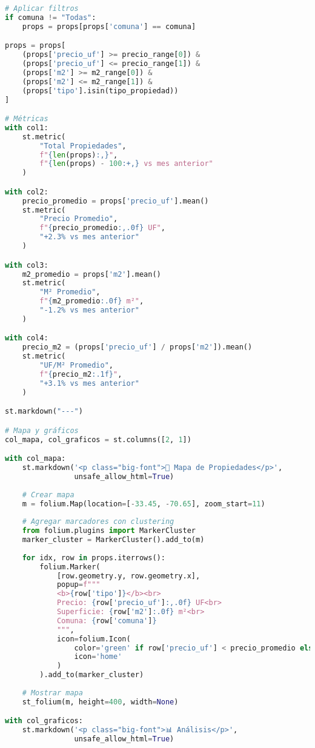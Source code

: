 \documentclass[11pt,a4paper]{article}
\begin{document}
\begin{lstlisting}[language=Python]
# Aplicar filtros
if comuna != "Todas":
    props = props[props['comuna'] == comuna]

props = props[
    (props['precio_uf'] >= precio_range[0]) &
    (props['precio_uf'] <= precio_range[1]) &
    (props['m2'] >= m2_range[0]) &
    (props['m2'] <= m2_range[1]) &
    (props['tipo'].isin(tipo_propiedad))
]

# Métricas
with col1:
    st.metric(
        "Total Propiedades",
        f"{len(props):,}",
        f"{len(props) - 100:+,} vs mes anterior"
    )

with col2:
    precio_promedio = props['precio_uf'].mean()
    st.metric(
        "Precio Promedio",
        f"{precio_promedio:,.0f} UF",
        "+2.3% vs mes anterior"
    )

with col3:
    m2_promedio = props['m2'].mean()
    st.metric(
        "M² Promedio",
        f"{m2_promedio:.0f} m²",
        "-1.2% vs mes anterior"
    )

with col4:
    precio_m2 = (props['precio_uf'] / props['m2']).mean()
    st.metric(
        "UF/M² Promedio",
        f"{precio_m2:.1f}",
        "+3.1% vs mes anterior"
    )

st.markdown("---")

# Mapa y gráficos
col_mapa, col_graficos = st.columns([2, 1])

with col_mapa:
    st.markdown('<p class="big-font">📍 Mapa de Propiedades</p>', 
                unsafe_allow_html=True)
    
    # Crear mapa
    m = folium.Map(location=[-33.45, -70.65], zoom_start=11)
    
    # Agregar marcadores con clustering
    from folium.plugins import MarkerCluster
    marker_cluster = MarkerCluster().add_to(m)
    
    for idx, row in props.iterrows():
        folium.Marker(
            [row.geometry.y, row.geometry.x],
            popup=f"""
            <b>{row['tipo']}</b><br>
            Precio: {row['precio_uf']:,.0f} UF<br>
            Superficie: {row['m2']:.0f} m²<br>
            Comuna: {row['comuna']}
            """,
            icon=folium.Icon(
                color='green' if row['precio_uf'] < precio_promedio else 'red',
                icon='home'
            )
        ).add_to(marker_cluster)
    
    # Mostrar mapa
    st_folium(m, height=400, width=None)

with col_graficos:
    st.markdown('<p class="big-font">📊 Análisis</p>', 
                unsafe_allow_html=True)
    

\end{lstlisting}
\end{document}
